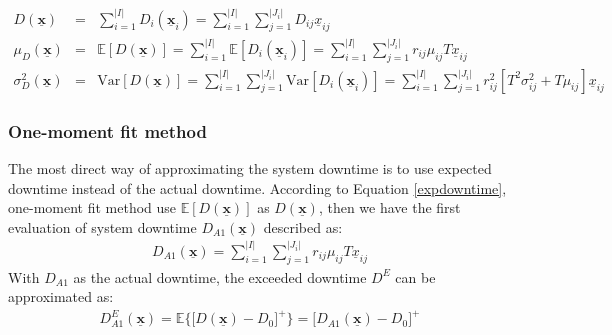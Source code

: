 \documentclass[preprint,12pt]{elsarticle}
\begin{document}
\begin{eqnarray}
D(\boldsymbol{\underline{x}}) &=& \sum_{i=1}^{\lvert I \rvert}D_{i}(\boldsymbol{\underline{x}}_{i})
=\sum_{i=1}^{\lvert I \rvert}\sum_{j=1}^{\lvert J_{i}\rvert}{D_{ij}\underline{x}_{ij}}  \\
\mu_{D}(\boldsymbol{\underline{x}})&=&\mathbb{E}[D(\boldsymbol{\underline{x}})] = \sum^{\lvert I \rvert}_{i=1}\mathbb{E}[D_{i}(\boldsymbol{\underline{x}}_{i})] = \sum^{\lvert I \rvert}_{i=1} \sum_{j=1}^{\lvert J_{i} \rvert}{r_{ij}\mu_{ij}T\underline{x}_{ij}} \label{expdowntime}\\
\sigma^{2}_{D}(\boldsymbol{\underline{x}})&=&\textrm{Var}[D(\boldsymbol{\underline{x}})] = \sum_{i=1}^{\lvert I \rvert} \sum_{j=1}^{\lvert J_{i} \rvert}\textrm{Var}[D_{i}(\boldsymbol{\underline{x}}_{i})] = \sum_{i=1}^{\lvert I \rvert}\sum_{j=1}^{\lvert J_{i} \rvert}r_{ij}^{2}[T^{2}\sigma^{2}_{ij}+T\mu_{ij}]\underline{x}_{ij} \label{vardowntime}
\end{eqnarray}
\normalsize
%
\subsubsection{One-moment fit method}

The most direct way of approximating the system downtime is to use expected downtime instead of the actual downtime. According to Equation \eqref{expdowntime}, one-moment fit method use $\mathbb{E}[D(\boldsymbol{\underline{x}})]$ as $D(\boldsymbol{\underline{x}})$, then we have the first evaluation of system downtime $D_{A1}(\boldsymbol{\underline{x}})$ described as:
\small
\begin{eqnarray}
D_{A1}(\boldsymbol{\underline{x}}) = \sum^{\lvert I \rvert}_{i=1} \sum_{j=1}^{\lvert J_{i} \rvert}{r_{ij}\mu_{ij}T\underline{x}_{ij}}
\label{approximation1}
\end{eqnarray}
\normalsize
With $D_{A1}$ as the actual downtime, the exceeded downtime $D^{E}$ can be approximated as:
\begin{eqnarray}
D^{E}_{A1}(\boldsymbol{\underline{x}}) =\mathbb{E}\bigg\{\bigg[D(\boldsymbol{\underline{x}})-D_{0}\bigg]^{+}\bigg\} = \bigg[D_{A1}(\boldsymbol{\underline{x}})-D_{0} \bigg]^{+} \label{penapproximation1}
\end{eqnarray}
\end{document}
